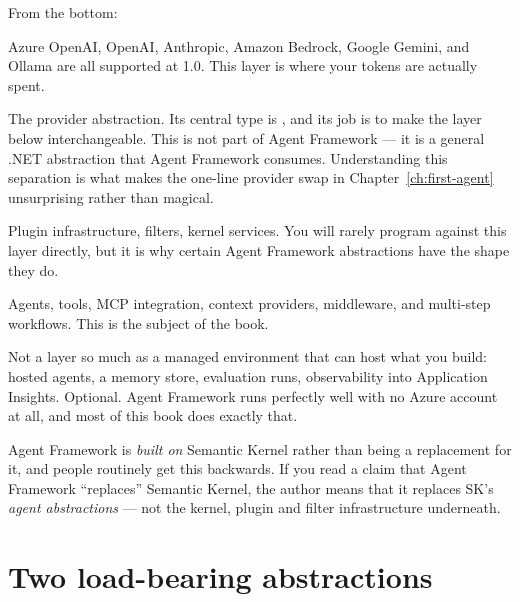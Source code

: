 From the bottom:

\begin{description}[leftmargin=0pt, style=nextline]
\item[Model providers.] Azure OpenAI, OpenAI, Anthropic, Amazon Bedrock, Google
Gemini, and Ollama are all supported at 1.0. This layer is where your tokens are
actually spent.

\item[\pkg{Microsoft.Extensions.AI}.] The provider abstraction. Its central type
is , and its job is to make the layer below interchangeable.
This is not part of Agent Framework --- it is a general .NET abstraction that
Agent Framework consumes. Understanding this separation is what makes the
one-line provider swap in Chapter~\ref{ch:first-agent} unsurprising rather than
magical.

\item[Semantic Kernel foundations.] Plugin infrastructure, filters, kernel
services. You will rarely program against this layer directly, but it is why
certain Agent Framework abstractions have the shape they do.

\item[Agent Framework.] Agents, tools, MCP integration, context providers,
middleware, and multi-step workflows. This is the subject of the book.

\item[Microsoft Foundry.] Not a layer so much as a managed environment that can
host what you build: hosted agents, a memory store, evaluation runs,
observability into Application Insights. Optional. Agent Framework runs perfectly
well with no Azure account at all, and most of this book does exactly that.
\end{description}

\begin{warning}
Agent Framework is \emph{built on} Semantic Kernel rather than being a
replacement for it, and people routinely get this backwards. If you read a claim
that Agent Framework ``replaces'' Semantic Kernel, the author means that it
replaces SK's \emph{agent abstractions} --- not the kernel, plugin and filter
infrastructure underneath.
\end{warning}

\section{Two load-bearing abstractions}
\label{sec:abstractions}

